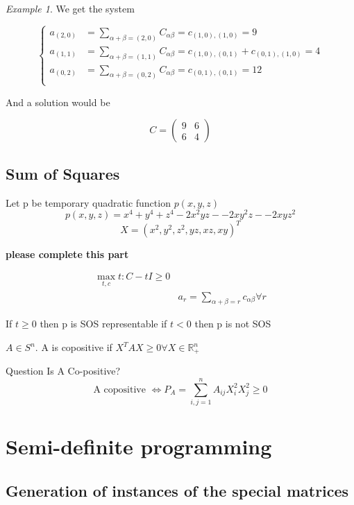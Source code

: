 \documentclass[onecolumn,11pt,a4paper]{article}
\theoremstyle{plain}  %
\theoremstyle{remark}  %
\newtheorem{example}[theorem]{Example}
\begin{document}
\begin{example}
We get the system

\begin{equation*}
	\left\{ \begin{aligned}
		a_{(2,0)} & = \sum_{\alpha + \beta = (2, 0)} C_{\alpha \beta} = c_{(1, 0),(1,
		0)} = 9\\
		a_{(1,1)} & = \sum_{\alpha + \beta = (1, 1)} C_{\alpha \beta} = c_{(1, 0),(0, 1)}
		+ c_{(0, 1),(1, 0)} = 4\\
		a_{(0,2)} & = \sum_{\alpha + \beta = (0, 2)} C_{\alpha \beta} = c_{(0, 1),(0,
		1)} = 12\\
	\end{aligned} \right.
\end{equation*}

And a solution would be

\begin{equation*}
	C = \begin{pmatrix}9 & 6 \\ 6 & 4 \end{pmatrix} 
\end{equation*}

\end{example}

\subsection{Sum of Squares}

Let p be temporary quadratic function  $p(x,y,z)$
\[ 
p(x,y,z) = x^4 + y^4 + z^4 - 2x^2yz -  - 2xy^2z -  - 2xyz^2 
\]
\[
X= ( x^2, y^2, z^2, yz, xz, xy)^T 
\]

\textbf{please complete this part}


\begin{align}
\max_{t, c} t: C - tI \geq 0 \\
& a_r = \sum_{\alpha + \beta= r} c_{\alpha  \beta} \forall r
\end{align}

If $t \geq 0 $ then p is SOS representable
if $t<0$ then p is not SOS

$A \in S^n $. A is copositive if $X^T A X \geq 0 \forall X \in \mathbb{R}_{+}^n$ 

Question Is A Co-positive?
\[
\text{A copositive } \Leftrightarrow P_A =\sum_{i, j = 1}^n A_{ij}X_i^2 X_j^2  \geq 0 \]
\section{Semi-definite programming}
\subsection{Generation of instances of the special matrices}
\label{sub:generation}
\newpage
\nocite{afonin2020extreme}

\end{document}
